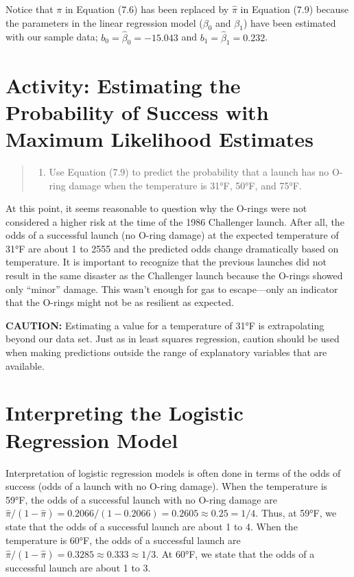 \documentclass[
]{report}
\providecommand{\tightlist}{%
  \setlength{\itemsep}{0pt}\setlength{\parskip}{0pt}}
\begin{document}
Notice that \(\pi\) in Equation (7.6) has been replaced by \(\hat\pi\) in Equation (7.9) because the parameters in the linear regression model (\(\beta_0\) and \(\beta_1\)) have been estimated with our sample data; \(b_0 = \hat\beta_0 = -15.043\) and \(b_1 = \hat\beta_1 = 0.232\).

\section{Activity: Estimating the Probability of Success with Maximum Likelihood Estimates}\label{activity-estimating-the-probability-of-success-with-maximum-likelihood-estimates-1}

\begin{quote}
\begin{enumerate}
\def\labelenumi{\arabic{enumi}.}
\setcounter{enumi}{6}
\tightlist
\item
  Use Equation (7.9) to predict the probability that a launch has no O-ring damage when the temperature is 31°F, 50°F, and 75°F.
\end{enumerate}
\end{quote}

At this point, it seems reasonable to question why the O-rings were not considered a higher risk at the time of the 1986 Challenger launch. After all, the odds of a successful launch (no O-ring damage) at the expected temperature of 31°F are about 1 to 2555 and the predicted odds change dramatically based on temperature. It is important to recognize that the previous launches did not result in the same disaster as the Challenger launch because the O-rings showed only ``minor'' damage. This wasn't enough for gas to escape---only an indicator that the O-rings might not be as resilient as expected.

\large

\textbf{CAUTION:} Estimating a value for a temperature of 31°F is extrapolating beyond our data set. Just as in least squares regression, caution should be used when making predictions outside the range of explanatory variables that are available.
\normalsize

\section{\texorpdfstring{\textbf{Interpreting the Logistic Regression Model}}{Interpreting the Logistic Regression Model}}\label{interpreting-the-logistic-regression-model}

Interpretation of logistic regression models is often done in terms of the odds of success (odds of a launch with no O-ring damage). When the temperature is 59°F, the odds of a successful launch with no O-ring damage are \(\hat\pi/(1 - \hat\pi) = 0.2066/(1 - 0.2066) = 0.2605 \approx 0.25 = 1/4\). Thus, at 59°F, we state that the odds of a successful launch are about 1 to 4. When the temperature is 60°F, the odds of a successful launch are \(\hat\pi/(1 - \hat\pi) = 0.3285 \approx 0.333 \approx 1/3\). At 60°F, we state that the odds of a successful launch are about 1 to 3.
\end{document}
